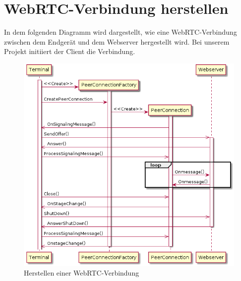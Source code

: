 \documentclass[entwurf.tex]{subfiles}
\begin{document}
  	\section{WebRTC-Verbindung herstellen}
  	\label{Sequence:WebRTCConnect}
		In dem folgenden Diagramm wird dargestellt, wie eine WebRTC-Verbindung zwischen dem Endgerät und dem Webserver hergestellt wird. Bei unserem Projekt initiiert der Client die Verbindung.
		
		\begin{figure}[H]
			\begin{center}
	 			\includegraphics[width=\textwidth]{diagrams/DataTransferSequenz.png}
  				\caption{Herstellen einer WebRTC-Verbindung}
  			\end{center}
  		\end{figure}
  		
  	\newpage
\end{document}
